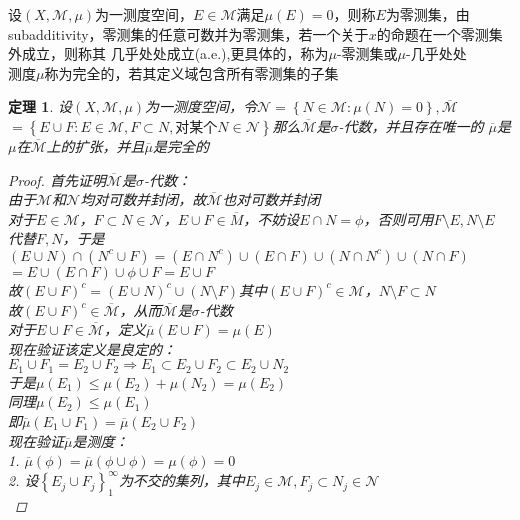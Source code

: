 \documentclass[12pt, a4paper, oneside]{ctexbook}
\newtheorem{theorem}{定理}[section]
\begin{document}
设$(X,\mathcal{M},\mu)$为一测度空间，$E\in\mathcal{M}$满足$\mu(E)=0$，则称$E$为零测集，由
subadditivity，零测集的任意可数并为零测集，若一个关于$x$的命题在一个零测集外成立，则称其
几乎处处成立(a.e.),更具体的，称为$\mu$-零测集或$\mu$-几乎处处\\
测度$\mu$称为完全的，若其定义域包含所有零测集的子集
\begin{theorem}
    设$(X,\mathcal{M},\mu)$为一测度空间，令$\mathcal{N}=\left\{N\in\mathcal{M}:\mu(N)=0\right\},\overline{\mathcal{M}}$
    $=\left\{E\cup F:E\in\mathcal{M},F\subset N,\text{对某个}N\in\mathcal{N}\right\}$那么$\overline{\mathcal{M}}$是$\sigma$-代数，并且存在唯一的
    $\overline{\mu}$是$\mu$在$\overline{\mathcal{M}}$上的扩张，并且$\overline{\mu}$是完全的
    \begin{proof}
        首先证明$\overline{\mathcal{M}}$是$\sigma$-代数：\\
        由于$\mathcal{M}$和$\mathcal{N}$均对可数并封闭，故$\overline{\mathcal{M}}$也对可数并封闭\\
        对于$E\in\mathcal{M}$，$F\subset N\in\mathcal{N}$，$E\cup F\in\overline{M}$，不妨设$E\cap N=\phi$，否则可用$F\setminus E,N\setminus E$
        代替$F,N$，于是$(E\cup N)\cap(N^c\cup F)=(E\cap N^c)\cup(E\cap F)\cup(N\cap N^c)\cup(N\cap F)$
        $=E\cup(E\cap F)\cup\phi\cup F=E\cup F$\\
        故$(E\cup F)^c=(E\cup N)^c\cup(N\setminus F)$其中$(E\cup F)^c\in\mathcal{M}$，$N\setminus F\subset N$\\
        故$(E\cup F)^c\in\overline{\mathcal{M}}$，从而$\overline{\mathcal{M}}$是$\sigma$-代数\\
        对于$E\cup F\in\overline{\mathcal{M}}$，定义$\overline{\mu}(E\cup F)=\mu(E)$\\
        现在验证该定义是良定的：\\
        $E_1\cup F_1=E_2\cup F_2\Rightarrow E_1\subset E_2\cup F_2\subset E_2\cup N_2$\\
        于是$\mu(E_1)\leq\mu(E_2)+\mu(N_2)=\mu(E_2)$\\
        同理$\mu(E_2)\leq\mu(E_1)$\\
        即$\overline{\mu}(E_1\cup F_1)=\overline{\mu}(E_2\cup F_2)$\\
        现在验证$\overline{\mu}$是测度：\\
        1. $\overline{\mu}(\phi)=\overline{\mu}(\phi\cup\phi)=\mu(\phi)=0$\\
        2. 设$\left\{E_j\cup F_j\right\}_1^{\infty}$为不交的集列，其中$E_j\in\mathcal{M},F_j\subset N_j\in\mathcal{N}$\\

\end{proof}
\end{theorem}
\end{document}
